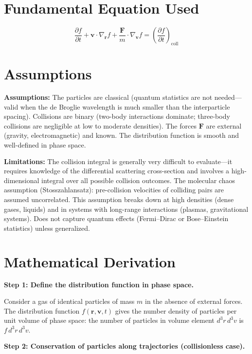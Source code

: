 \documentclass[11pt,openright]{book}
\begin{document}
\section*{Fundamental Equation Used}

\begin{equation}
\frac{\partial f}{\partial t} + \mathbf{v}\cdot\nabla_{\mathbf{r}} f + \frac{\mathbf{F}}{m}\cdot\nabla_{\mathbf{v}} f = \left(\frac{\partial f}{\partial t}\right)_{\text{coll}}
\end{equation}
\section*{Assumptions}

\textbf{Assumptions:} The particles are classical (quantum statistics are not needed---valid when the de Broglie wavelength is much smaller than the interparticle spacing). Collisions are binary (two-body interactions dominate; three-body collisions are negligible at low to moderate densities). The forces $\mathbf{F}$ are external (gravity, electromagnetic) and known. The distribution function is smooth and well-defined in phase space.


\textbf{Limitations:} The collision integral is generally very difficult to evaluate---it requires knowledge of the differential scattering cross-section and involves a high-dimensional integral over all possible collision outcomes. The molecular chaos assumption (Stosszahlansatz): pre-collision velocities of colliding pairs are assumed uncorrelated. This assumption breaks down at high densities (dense gases, liquids) and in systems with long-range interactions (plasmas, gravitational systems). Does not capture quantum effects (Fermi--Dirac or Bose--Einstein statistics) unless generalized.


\section*{Mathematical Derivation}

\textbf{Step 1: Define the distribution function in phase space.}

Consider a gas of identical particles of mass $m$ in the absence of external forces. The distribution function $f(\mathbf{r},\mathbf{v},t)$ gives the number density of particles per unit volume of phase space: the number of particles in volume element $d^3r\,d^3v$ is $f\,d^3r\,d^3v$.

\textbf{Step 2: Conservation of particles along trajectories (collisionless case).}
\end{document}

